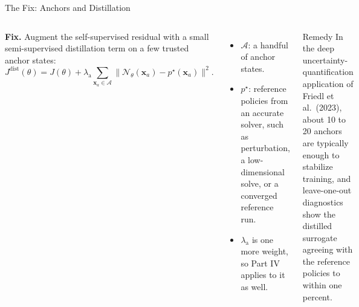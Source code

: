 \documentclass[aspectratio=169,11pt]{beamer}
\newcommand{\emphc}[1]{\textcolor{harvardcrimson}{#1}}
\newcommand{\x}{\bm{x}}
\newcommand{\param}{\theta}          %
\newcommand{\state}{\bm{x}}          %
\newcommand{\net}{\mathcal{N}_{\param}} %
\begin{document}
\begin{frame}{The Fix: Anchors and Distillation}
\vspace*{\fill}
\begin{columns}[T,onlytextwidth]
\textbf{Fix.} Augment the self-supervised residual with a small \emphc{semi-supervised distillation} term on a few trusted anchor states:
\[
  J^{\mathrm{dist}}(\param)=J(\param)
   +\lambda_{\mathrm{a}}\!\sum_{\state_a\in\mathcal A}\!\bigl\|\net(\state_a)-p^\star(\state_a)\bigr\|^2 .
\]
\begin{itemize}\setlength\itemsep{3pt}
  \item $\mathcal A$: a handful of anchor states.
  \item $p^\star$: reference policies from an accurate solver, such as perturbation, a low-dimensional solve, or a converged reference run.
  \item $\lambda_{\mathrm{a}}$ is one more weight, so Part IV applies to it as well.
\end{itemize}
\begin{exampleblock}{Remedy}
\footnotesize
In the deep uncertainty-quantification application of Friedl et al.\ (2023), about \emphc{10 to 20 anchors} are typically enough to stabilize training, and leave-one-out diagnostics show the distilled surrogate agreeing with the reference policies to \emphc{within one percent}.
\end{exampleblock}
\end{columns}
\vspace*{\fill}
\end{frame}
\end{document}
